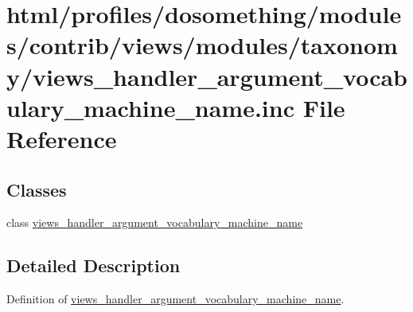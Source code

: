 \hypertarget{views__handler__argument__vocabulary__machine__name_8inc}{
\section{html/profiles/dosomething/modules/contrib/views/modules/taxonomy/views\_\-handler\_\-argument\_\-vocabulary\_\-machine\_\-name.inc File Reference}
\label{views__handler__argument__vocabulary__machine__name_8inc}
}
\subsection*{Classes}
\begin{DoxyCompactItemize}
\item 
class \hyperlink{classviews__handler__argument__vocabulary__machine__name}{views\_\-handler\_\-argument\_\-vocabulary\_\-machine\_\-name}
\end{DoxyCompactItemize}


\subsection{Detailed Description}
Definition of \hyperlink{classviews__handler__argument__vocabulary__machine__name}{views\_\-handler\_\-argument\_\-vocabulary\_\-machine\_\-name}. 